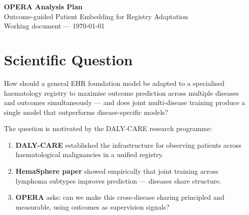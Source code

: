 \documentclass[11pt, a4paper]{article}
\begin{document}
\noindent{}\par\medskip


\begin{center}
  {\LARGE \textbf{OPERA Analysis Plan}} \\[0.4em]
  {\large Outcome-guided Patient Embedding for Registry Adaptation} \\[0.2em]
  {\color{muted}\small Working document — \today}
\end{center}

\vspace{0.5em}

\section{Scientific Question}

\begin{tcolorbox}[planbox, title=Core question]
How should a general EHR foundation model be adapted to a specialised
haematology registry to maximise outcome prediction across multiple
diseases and outcomes simultaneously — and does joint multi-disease
training produce a single model that outperforms disease-specific models?
\end{tcolorbox}

\medskip

The question is motivated by the DALY-CARE research programme:

\begin{enumerate}[leftmargin=2em, itemsep=2pt]
  \item \textbf{DALY-CARE} established the infrastructure for observing patients across haematological malignancies in a unified registry.
  \item \textbf{HemaSphere paper} showed empirically that joint training across lymphoma subtypes improves prediction — diseases share structure.
  \item \textbf{OPERA} asks: can we make this cross-disease sharing principled and measurable, using outcomes as supervision signals?
\end{enumerate}
\end{document}
